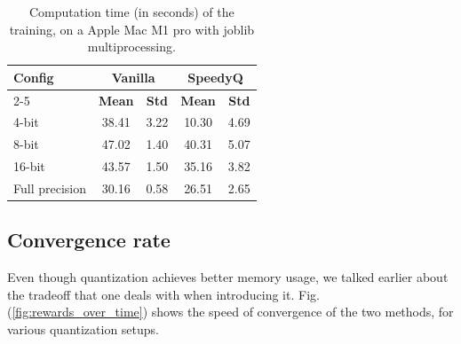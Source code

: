 \documentclass[10pt,conference,compsocconf]{IEEEtran}
\begin{document}
        \begin{table}[t]
        \centering
        \begin{tabular}{|l|cc|cc|}
        \hline
        \multirow{2}{*}{\textbf{Config}} & \multicolumn{2}{c|}{\textbf{Vanilla}} & \multicolumn{2}{c|}{\textbf{SpeedyQ}} \\ \cline{2-5}
                                         & \multicolumn{1}{c|}{\textbf{Mean}} & \textbf{Std} & \multicolumn{1}{c|}{\textbf{Mean}} & \textbf{Std} \\ \hline
        4-bit                            & \multicolumn{1}{c|}{38.41} & 3.22 & \multicolumn{1}{c|}{10.30} & 4.69 \\ \hline
        8-bit                            & \multicolumn{1}{c|}{47.02} & 1.40 & \multicolumn{1}{c|}{40.31} & 5.07 \\ \hline
        16-bit                           & \multicolumn{1}{c|}{43.57} & 1.50 & \multicolumn{1}{c|}{35.16} & 3.82 \\ \hline
        Full precision                   & \multicolumn{1}{c|}{30.16} & 0.58 & \multicolumn{1}{c|}{26.51} & 2.65 \\ \hline
        \end{tabular}
        \caption{Computation time (in seconds) of the training, on a Apple Mac M1 pro with joblib multiprocessing.}
        \label{tab:computation_time}
        \end{table}

    

        \subsection{Convergence rate}

        Even though quantization achieves better memory usage, we talked earlier about the tradeoff that one deals with when introducing it. Fig. (\ref{fig:rewards_over_time}) shows the speed of convergence of the two methods, for various quantization setups.
\end{document}
